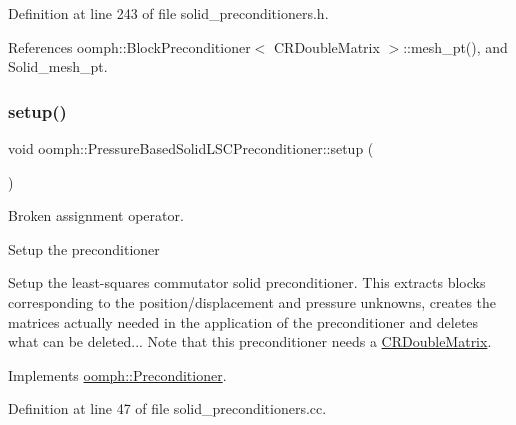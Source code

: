 Definition at line 243 of file solid\+\_\+preconditioners.\+h.



References oomph\+::\+Block\+Preconditioner$<$ C\+R\+Double\+Matrix $>$\+::mesh\+\_\+pt(), and Solid\+\_\+mesh\+\_\+pt.

\mbox{\label{classoomph_1_1PressureBasedSolidLSCPreconditioner_aba594f38c2d36775115adbc90bcd0025}} 
\subsubsection{\texorpdfstring{setup()}{setup()}}
{\footnotesize\ttfamily void oomph\+::\+Pressure\+Based\+Solid\+L\+S\+C\+Preconditioner\+::setup (\begin{DoxyParamCaption}{ }\end{DoxyParamCaption})\hspace{0.3cm}{\ttfamily [virtual]}}



Broken assignment operator. 

Setup the preconditioner

Setup the least-\/squares commutator solid preconditioner. This extracts blocks corresponding to the position/displacement and pressure unknowns, creates the matrices actually needed in the application of the preconditioner and deletes what can be deleted... Note that this preconditioner needs a \hyperlink{classoomph_1_1CRDoubleMatrix}{C\+R\+Double\+Matrix}. 

Implements \hyperlink{classoomph_1_1Preconditioner_af4886f4efe510e5c9b0eb19422943588}{oomph\+::\+Preconditioner}.



Definition at line 47 of file solid\+\_\+preconditioners.\+cc.



